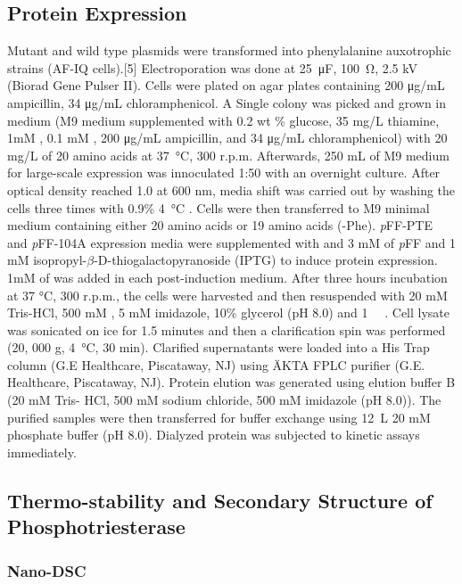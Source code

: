 \begin{refsection}
\subsection{Protein Expression}
Mutant and wild type plasmids were transformed into  phenylalanine
auxotrophic strains (AF-IQ cells).[5] Electroporation was done at
\SI{25}{\micro\farad}, \SI{100}{\ohm}, 2.5 kV (Biorad Gene Pulser II). Cells were
plated on agar plates containing 200 μg/mL ampicillin, 34 μg/mL
chloramphenicol. A Single colony was picked and grown in medium (M9 medium
supplemented with 0.2 wt \% glucose, 35 mg/L thiamine, 1mM , 0.1 mM
, 200 μg/mL ampicillin, and 34 μg/mL chloramphenicol) with 20 mg/L of
20 amino acids at \SI{37}{\celsius}, 300 r.p.m.  Afterwards, 250 mL of M9
medium for large-scale expression was innoculated 1:50 with an overnight
culture. After optical density reached 1.0 at 600 nm, media shift was carried
out by washing the cells three times with 0.9\% \SI{4}{\celsius} .
Cells were then transferred to M9 minimal medium containing either 20 amino
acids or 19 amino acids (-Phe). \emph{p}FF-PTE and \emph{p}FF-104A expression
media were supplemented with and 3 mM of \emph{p}FF and 1 mM
isopropyl-$\beta$-D-thiogalactopyranoside (IPTG) to induce protein expression.
1mM of  was added in each post-induction medium. After three hours
incubation at 37 °C, 300 r.p.m., the cells were harvested and then resuspended
with 20 mM Tris-HCl, 500 mM , 5 mM imidazole, 10\% glycerol (pH 8.0)
and \SI{1}{\micro\moLar} . Cell lysate was sonicated on ice for 1.5
minutes and then a clarification spin was performed (20, 000 g,
\SI{4}{\celsius}, 30 min).  Clarified supernatants were loaded into a His
Trap column (G.E Healthcare, Piscataway, NJ) using ÄKTA FPLC purifier (G.E.
Healthcare, Piscataway, NJ).  Protein elution was generated using elution
buffer B (20 mM Tris- HCl, 500 mM sodium chloride, 500 mM imidazole (pH 8.0)).
The purified samples were then transferred for buffer exchange using
\SI{12}{\liter} 20 mM phosphate buffer (pH 8.0).  Dialyzed protein was
subjected to kinetic assays immediately.

\subsection{Thermo-stability and Secondary Structure of Phosphotriesterase}
\label{sec:thermo}

\subsubsection{Nano-DSC}


\end{refsection}
